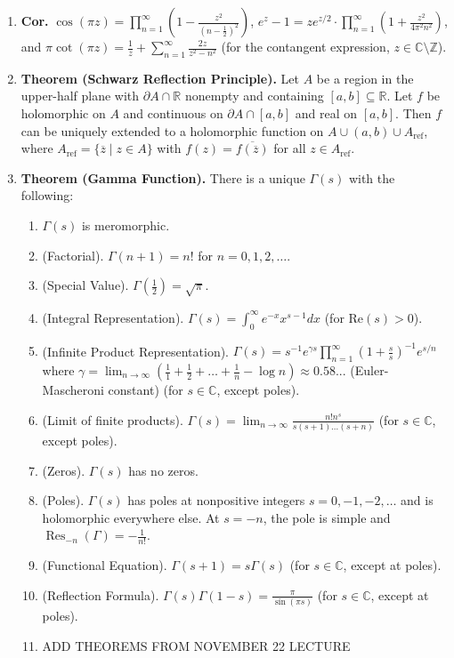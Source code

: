 \documentclass[11pt]{article}
\theoremstyle{definition}
\theoremstyle{named}
\DeclareMathOperator{\Res}{Res}
\begin{document}
\begin{enumerate}
    \item \textbf{Cor. } $\cos(\pi z) = \prod_{n=1}^{\infty} \left(1 - \frac{z^2}{\left(n - \frac{1}{2}\right)^2}\right)$, $e^z - 1 = ze^{z/2} \cdot \prod_{n=1}^{\infty} \left(1 + \frac{z^2}{4\pi^2n^2}\right)$, and $\pi\cot(\pi z) = \frac{1}{z} + \sum_{n=1}^{\infty} \frac{2z}{z^2 - n^2}$ (for the contangent expression, $z \in \mathbb{C} \setminus \mathbb{Z}$). 
    \item \textbf{Theorem (Schwarz Reflection Principle). } Let $A$ be a region in the upper-half plane with $\partial A \cap \mathbb{R}$ nonempty and containing $[a,b] \subseteq \mathbb{R}$. Let $f$ be holomorphic on $A$ and continuous on $\partial A \cap [a,b]$ and real on $[a,b]$. Then $f$ can be uniquely extended to a holomorphic function on $A \cup (a,b) \cup A_{\textrm{ref}}$, where $A_{\textrm{ref}} = \{\overline{z} \mid z \in A\}$ with $f(z) = \overline{f(\overline{z})}$ for all $z \in A_{\textrm{ref}}$. 
    \item \textbf{Theorem (Gamma Function). } There is a unique $\Gamma(s)$ with the following: 
    \begin{enumerate}
        \item $\Gamma(s)$ is meromorphic. 
        \item (Factorial). $\Gamma(n+1) = n!$ for $n=0,1,2,\dots$. 
        \item (Special Value). $\Gamma(\frac{1}{2}) = \sqrt{\pi}$. 
        \item (Integral Representation). $\Gamma(s) = \int_{0}^{\infty} e^{-x} x^{s-1} dx$ (for $\textrm{Re}(s) > 0$). 
        \item (Infinite Product Representation). $\Gamma(s) = s^{-1}e^{\gamma s} \prod_{n=1}^{\infty} \left(1 + \frac{s}{s}\right)^{-1} e^{s/n}$ where $\gamma = \lim_{n \to \infty} \left(\frac{1}{1} + \frac{1}{2} + \dots + \frac{1}{n} - \log n\right) \approx 0.58...$ (Euler-Mascheroni constant) (for $s \in \mathbb{C}$, except poles). 
        \item (Limit of finite products). $\Gamma(s) = \lim_{n \to \infty} \frac{n! n^s}{s(s+1)\dots(s+n)}$ (for $s \in \mathbb{C}$, except poles). 
        \item (Zeros). $\Gamma(s)$ has no zeros. 
        \item (Poles). $\Gamma(s)$ has poles at nonpositive integers $s=0,-1,-2,\dots$ and is holomorphic everywhere else. At $s=-n$, the pole is simple and $\Res_{-n}(\Gamma) = -\frac{1}{n!}$. 
        \item (Functional Equation). $\Gamma(s+1) = s\Gamma(s)$ (for $s \in \mathbb{C}$, except at poles). 
        \item (Reflection Formula). $\Gamma(s)\Gamma(1-s) = \frac{\pi}{\sin(\pi s)}$ (for $s \in \mathbb{C}$, except at poles). 
        \item ADD THEOREMS FROM NOVEMBER 22 LECTURE
    \end{enumerate}
\end{enumerate}
\end{document}
